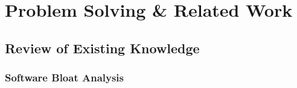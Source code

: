 \section{Problem Solving & Related Work}
\label{sec:problem-solving-related-work}

\subsection{Review of Existing Knowledge}
\label{subsec:review-of-existing-knowledge}


\subsubsection*{Software Bloat Analysis}

